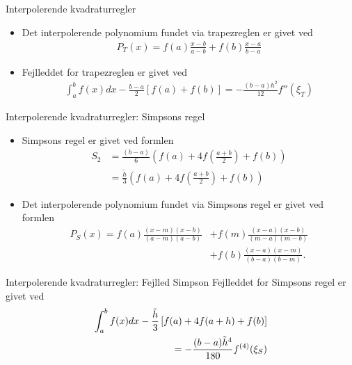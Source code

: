 \begin{frame}{Interpolerende kvadraturregler}
\begin{itemize}
    \item Det interpolerende polynomium fundet via trapezreglen er givet ved
    \begin{align*}
    P_{T}(x)=f(a)\frac{x-b}{a-b}+f(b)\frac{x-a}{b-a}       
    \end{align*}
    \item Fejlleddet for trapezreglen er givet ved 
    \begin{align*}
    \int_{a}^{b}f(x)dx-\frac{b-a}{2}\left [ f(a)+f(b) \right ]=-\frac{(b-a)h^2}{12}{f}''(\xi_T)
    \end{align*}
\end{itemize}
\end{frame}


\begin{frame}{Interpolerende kvadraturregler: Simpsons regel}
    \begin{itemize}
    \item Simpsons regel er givet ved formlen 
    \begin{align*}
    S_2 &= \frac{(b-a)}{6}(f(a)+4f(\frac{a+b}{2})+f(b))\\
    &=\frac{\widetilde{h}}{3}(f(a)+4f(\frac{a+b}{2})+f(b))
    \end{align*}
    \item Det interpolerende polynomium fundet via Simpsons regel er givet ved formlen
    \begin{align*}
    P_{S}(x)=f(a)\frac{(x-m)(x-b)}{(a-m)(a-b)}&+f(m)\frac{(x-a)(x-b)}{(m-a)(m-b)}\\
    &+f(b)\frac{(x-a)(x-m)}{(b-a)(b-m)}.
    \end{align*}
       \end{itemize}
\end{frame}


\begin{frame}{Interpolerende kvadraturregler: Fejlled Simpson}
    Fejlleddet for Simpsons regel er givet ved 
    \begin{align*}
    \int_{a}^{b}f(x)dx-\frac{\Tilde{h}}{3}\left [ f(a)+4f(a+h) + f(b) \right ]\\
    =-\frac{(b-a)\Tilde{h}^4}{180}{f}^{(4)}(\xi_S)
    \end{align*}
    
\end{frame}


